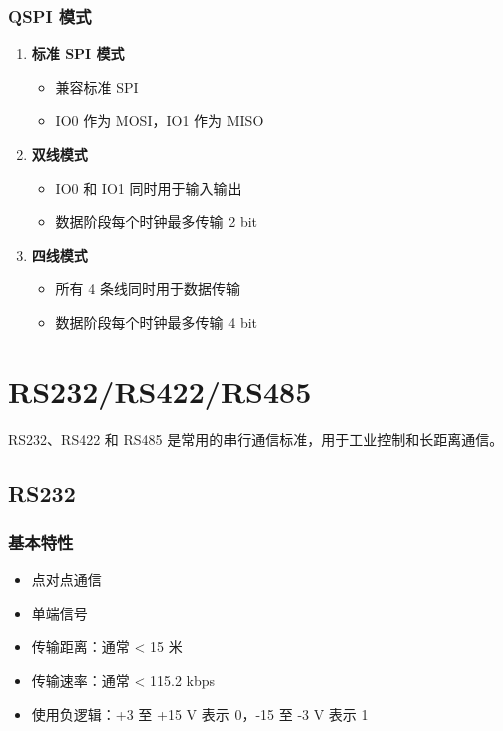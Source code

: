 \subsubsection{QSPI 模式}

\begin{enumerate}
  \item \textbf{标准 SPI 模式}
    \begin{itemize}
      \item 兼容标准 SPI
      \item IO0 作为 MOSI，IO1 作为 MISO
    \end{itemize}

  \item \textbf{双线模式}
    \begin{itemize}
      \item IO0 和 IO1 同时用于输入输出
      \item 数据阶段每个时钟最多传输 2 bit
    \end{itemize}

  \item \textbf{四线模式}
    \begin{itemize}
      \item 所有 4 条线同时用于数据传输
      \item 数据阶段每个时钟最多传输 4 bit
    \end{itemize}
\end{enumerate}

\section{RS232/RS422/RS485}

RS232、RS422 和 RS485 是常用的串行通信标准，用于工业控制和长距离通信。

\subsection{RS232}

\subsubsection{基本特性}

\begin{itemize}
  \item 点对点通信
  \item 单端信号
  \item 传输距离：通常 < 15 米
  \item 传输速率：通常 < 115.2 kbps
  \item 使用负逻辑：+3 至 +15 V 表示 0，-15 至 -3 V 表示 1
\end{itemize}

